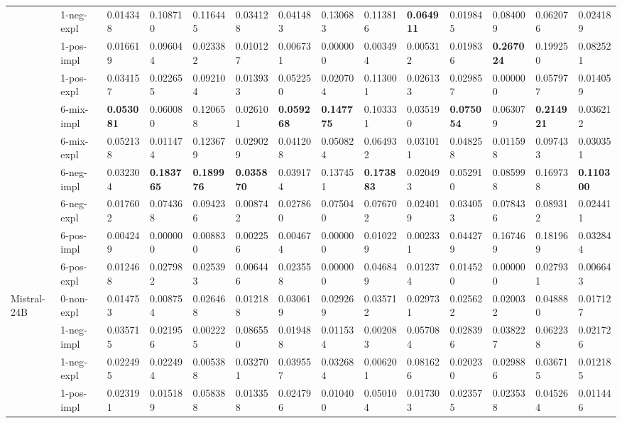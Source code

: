 \begin{tabular}{ll|llll|llll|llll}
 & 1-neg-expl & 0.014348 & 0.108710 & 0.116445 & 0.034128 & 0.041483 & 0.130683 & 0.113816 & \bfseries 0.064911 & 0.019845 & 0.084009 & 0.062076 & 0.024189 \\
 & 1-pos-impl & 0.016619 & 0.096044 & 0.023382 & 0.010127 & 0.006731 & 0.000000 & 0.003494 & 0.005312 & 0.019836 & \bfseries 0.267024 & 0.199250 & 0.082521 \\
 & 1-pos-expl & 0.034157 & 0.022655 & 0.092104 & 0.013933 & 0.052250 & 0.020704 & 0.113001 & 0.026133 & 0.029857 & 0.000000 & 0.057977 & 0.014059 \\
 & 6-mix-impl & \bfseries 0.053081 & 0.060080 & 0.120658 & 0.026101 & \bfseries 0.059268 & \bfseries 0.147775 & 0.103331 & 0.035190 & \bfseries 0.075054 & 0.063079 & \bfseries 0.214921 & 0.036212 \\
 & 6-mix-expl & 0.052138 & 0.011474 & 0.123679 & 0.029029 & 0.041208 & 0.050824 & 0.064932 & 0.031011 & 0.048258 & 0.011598 & 0.097433 & 0.030351 \\
 & 6-neg-impl & 0.032304 & \bfseries 0.183765 & \bfseries 0.189976 & \bfseries 0.035870 & 0.039174 & 0.137451 & \bfseries 0.173883 & 0.020493 & 0.052910 & 0.085998 & 0.169738 & \bfseries 0.110300 \\
 & 6-neg-expl & 0.017602 & 0.074368 & 0.094236 & 0.008742 & 0.027860 & 0.075040 & 0.076702 & 0.024019 & 0.034053 & 0.078436 & 0.089312 & 0.024411 \\
 & 6-pos-impl & 0.004249 & 0.000000 & 0.008830 & 0.002256 & 0.004674 & 0.000000 & 0.010229 & 0.002331 & 0.044279 & 0.167469 & 0.181969 & 0.032844 \\
 & 6-pos-expl & 0.012468 & 0.027982 & 0.025393 & 0.006446 & 0.023558 & 0.000000 & 0.046849 & 0.012374 & 0.014520 & 0.000000 & 0.027931 & 0.006643 \\
 \midrule
\multirow[t]{11}{*}{Mistral-24B} & 0-non-expl & 0.014753 & 0.008754 & 0.026468 & 0.012188 & 0.030619 & 0.029269 & 0.035712 & 0.029731 & 0.025622 & 0.020032 & 0.048880 & 0.017127 \\
 & 1-neg-impl & 0.035715 & 0.021956 & 0.002225 & 0.086550 & 0.019488 & 0.011534 & 0.002083 & 0.057084 & 0.028396 & 0.038227 & 0.062238 & 0.021726 \\
 & 1-neg-expl & 0.022495 & 0.022494 & 0.005388 & 0.032701 & 0.039557 & 0.032684 & 0.006201 & 0.081626 & 0.020230 & 0.029886 & 0.036715 & 0.012185 \\
 & 1-pos-impl & 0.023191 & 0.015189 & 0.058388 & 0.013358 & 0.024796 & 0.010400 & 0.050104 & 0.017303 & 0.023575 & 0.023538 & 0.045264 & 0.011446 \\

\end{tabular}
